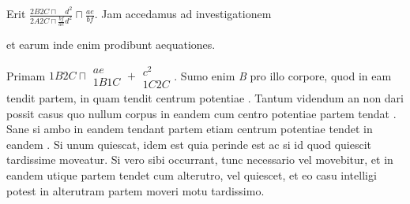 %
Erit $\displaystyle\frac{{\scriptstyle \textit{2}}B{\scriptstyle \textit{2}}C \sqcap \phantom{ bf} d^2}{{\scriptstyle \textit{2}}A{\scriptstyle \textit{2}}C \sqcap \displaystyle\frac{bf}{ae}d^2}\sqcap\displaystyle\frac{ae}{bf}$.
%
Jam accedamus ad investigationem
%
\rule[0cm]{0mm}{12pt}%
%
et earum 
inde
enim prodibunt aequationes. 
%
\rule[0cm]{0mm}{16pt}%
Primam 
${\scriptstyle \textit{1}}B{\scriptstyle \textit{2}}C \sqcap \begin{array}{c} ae\\ {\scriptstyle \textit{1}}B{\scriptstyle \textit{1}}C \end{array} + 
\begin{array}{c}c^2\\ {\scriptstyle \textit{1}}C{\scriptstyle \textit{2}}C \end{array}$. 
%
Sumo enim \textit{B} pro illo corpore, quod in eam tendit 
partem, in quam tendit centrum potentiae\protect{}
%
.
%
Tantum videndum an non dari possit casus quo nullum corpus in eandem
cum centro potentiae\protect{} partem tendat
%
. Sane si ambo in eandem tendant partem etiam centrum potentiae\protect{}
tendet in eandem 
%
.
%
Si unum quiescat, idem est quia perinde est ac si id quod quiescit tardissime moveatur.
Si vero sibi occurrant, tunc necessario
%
%
vel movebitur, et in eandem utique partem tendet
cum alterutro, vel quiescet, et eo casu intelligi potest in alterutram partem moveri motu tardissimo.\protect{}
